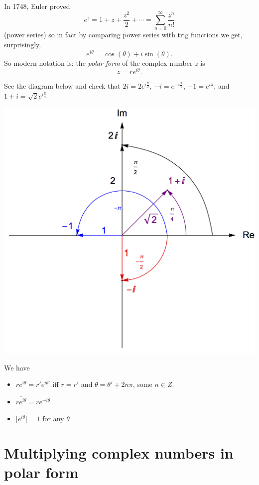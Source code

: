 In 1748, Euler proved
$$
e^z = 1 + z + \frac{z^2}{2} + \cdots = \sum_{n=0}^\infty \frac{z^n}{n!}
$$
(power series) so in fact by comparing power series with trig functions
we get, surprisingly,
$$
e^{i\theta} = \cos(\theta) + i\sin(\theta).
$$ 
So modern notation is:  the \emph{polar form} of the complex number $z$
is 
$$
z = r e^{i\theta}.
$$

\begin{example}
See the diagram below and check that  $2i= 2e^{i \frac{\pi}2}$, $-i=e^{-i \frac{\pi}2}$, $-1 = e^{i\pi}$, and  
$1+i =\sqrt{2}e^{i \frac{\pi}4}$
\end{example}
\begin{center}
\includegraphics[scale=.6]{img/PolarFormExample.jpg}
\end{center}


We have
\begin{itemize}
\item  $re^{i\theta} = r' e^{i\theta'}$ iff $r=r'$ and $\theta = \theta' + 2n\pi$, some $n\in Z$.
\item $\overline{re^{i\theta}} = re^{-i\theta}$
\item $\vert e^{i\theta} \vert = 1$ for any $\theta$
\end{itemize}

\section{Multiplying complex numbers in polar form}

